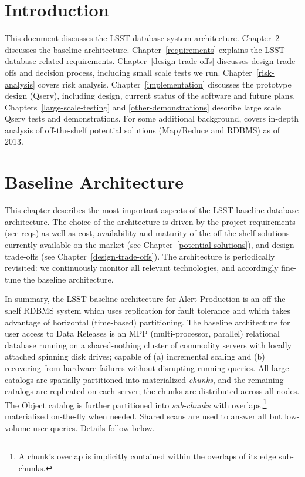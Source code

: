\documentclass[DM,lsstdraft,toc]{lsstdoc}
\begin{document}
\section{Introduction}\label{introduction}

This document discusses the LSST database system architecture. Chapter~\ref{baseline-architecture} discusses the baseline
architecture. Chapter~\ref{requirements} explains the LSST database-related
requirements.
Chapter~\ref{design-trade-offs} discusses design trade-offs
and decision process, including small scale tests we run.
Chapter~\ref{risk-analysis} covers risk analysis.
Chapter~\ref{implementation} discusses the
prototype design (Qserv), including design, current status of the
software and future plans.
Chapters~\ref{large-scale-testing} and \ref{other-demonstrations}
describe large scale Qserv
tests and demonstrations.
For some additional background,  covers in-depth analysis
of off-the-shelf potential solutions (Map/Reduce and RDBMS) as of 2013.

\section{Baseline Architecture}\label{baseline-architecture}

This chapter describes the most important aspects of the LSST baseline
database architecture. The choice of the architecture is driven by the
project requirements (see reqs) as well as cost, availability and
maturity of the off-the-shelf solutions currently available on the
market (see Chapter~\ref{potential-solutions}), and design trade-offs (see
Chapter~\ref{design-trade-offs}). The architecture is periodically revisited: we
continuously monitor all relevant technologies, and accordingly
fine-tune the baseline architecture.

In summary, the LSST baseline architecture for Alert Production is an
off-the-shelf RDBMS system which uses replication for fault tolerance
and which takes advantage of horizontal (time-based) partitioning. The
baseline architecture for user access to Data Releases is an MPP
(multi-processor, parallel) relational database running on a
shared-nothing cluster of commodity servers with locally attached
spinning disk drives; capable of (a) incremental scaling and (b)
recovering from hardware failures without disrupting running queries.
All large catalogs are spatially partitioned into materialized
\emph{chunks}, and the remaining catalogs are replicated on each server;
the chunks are distributed across all nodes. The Object catalog is
further partitioned into \emph{sub-chunks} with overlaps,\footnote{A
  chunk's overlap is implicitly contained within the overlaps of its
  edge sub-chunks.} materialized on-the-fly when needed. Shared scans
are used to answer all but low-volume user queries. Details follow
below.
\end{document}
